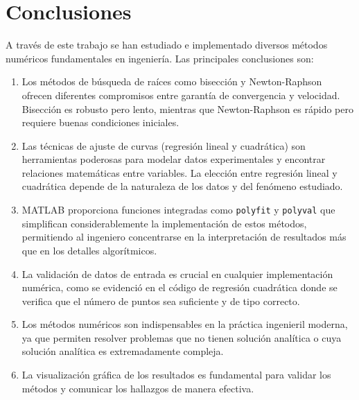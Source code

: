 \documentclass[12pt,a4paper]{article}
\begin{document}
\section{Conclusiones}

A través de este trabajo se han estudiado e implementado diversos métodos numéricos fundamentales en ingeniería. Las principales conclusiones son:

\begin{enumerate}
    \item Los métodos de búsqueda de raíces como bisección y Newton-Raphson ofrecen diferentes compromisos entre garantía de convergencia y velocidad. Bisección es robusto pero lento, mientras que Newton-Raphson es rápido pero requiere buenas condiciones iniciales.
    
    \item Las técnicas de ajuste de curvas (regresión lineal y cuadrática) son herramientas poderosas para modelar datos experimentales y encontrar relaciones matemáticas entre variables. La elección entre regresión lineal y cuadrática depende de la naturaleza de los datos y del fenómeno estudiado.
    
    \item MATLAB proporciona funciones integradas como \texttt{polyfit} y \texttt{polyval} que simplifican considerablemente la implementación de estos métodos, permitiendo al ingeniero concentrarse en la interpretación de resultados más que en los detalles algorítmicos.
    
    \item La validación de datos de entrada es crucial en cualquier implementación numérica, como se evidenció en el código de regresión cuadrática donde se verifica que el número de puntos sea suficiente y de tipo correcto.
    
    \item Los métodos numéricos son indispensables en la práctica ingenieril moderna, ya que permiten resolver problemas que no tienen solución analítica o cuya solución analítica es extremadamente compleja.
    
    \item La visualización gráfica de los resultados es fundamental para validar los métodos y comunicar los hallazgos de manera efectiva.
\end{enumerate}

\newpage


\end{document}
